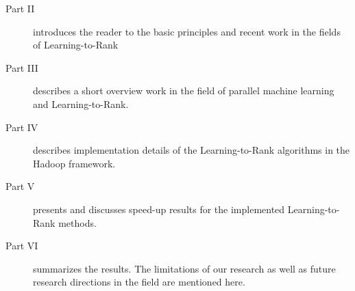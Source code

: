 \begin{description}
\item[Part II ]{introduces the reader to the basic principles and recent work in the fields of Learning-to-Rank}
\item[Part III ]{describes a short overview work in the field of parallel machine learning and Learning-to-Rank.}
\item[Part IV ]{describes implementation details of the Learning-to-Rank algorithms in the Hadoop framework.}
\item[Part V ]{presents and discusses speed-up results for the implemented Learning-to-Rank methods.}
\item[Part VI ]{summarizes the results. The limitations of our research as well as future research directions in the field are mentioned here.}
\end{description}